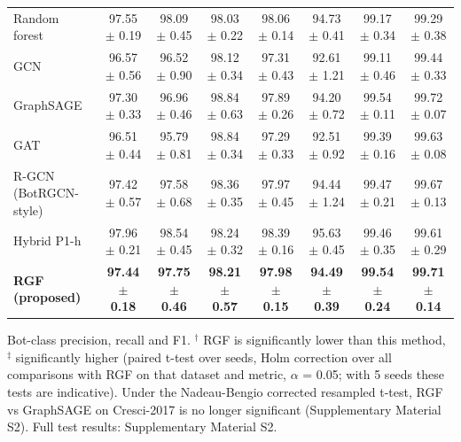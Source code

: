 \begin{table}[!t]
\begin{tabular}{lccccccc}
Random forest & 97.55 $\pm$ 0.19 & 98.09 $\pm$ 0.45 & 98.03 $\pm$ 0.22 & 98.06 $\pm$ 0.14 & 94.73 $\pm$ 0.41 & 99.17 $\pm$ 0.34 & 99.29 $\pm$ 0.38 \\
GCN & 96.57 $\pm$ 0.56 & 96.52 $\pm$ 0.90 & 98.12 $\pm$ 0.34 & 97.31 $\pm$ 0.43 & 92.61 $\pm$ 1.21 & 99.11 $\pm$ 0.46 & 99.44 $\pm$ 0.33 \\
GraphSAGE & 97.30 $\pm$ 0.33 & 96.96 $\pm$ 0.46 & 98.84 $\pm$ 0.63 & 97.89 $\pm$ 0.26 & 94.20 $\pm$ 0.72 & 99.54 $\pm$ 0.11 & 99.72 $\pm$ 0.07 \\
GAT & 96.51 $\pm$ 0.44 & 95.79 $\pm$ 0.81 & 98.84 $\pm$ 0.34 & 97.29 $\pm$ 0.33 & 92.51 $\pm$ 0.92 & 99.39 $\pm$ 0.16 & 99.63 $\pm$ 0.08 \\
R-GCN (BotRGCN-style) & 97.42 $\pm$ 0.57 & 97.58 $\pm$ 0.68 & 98.36 $\pm$ 0.35 & 97.97 $\pm$ 0.45 & 94.44 $\pm$ 1.24 & 99.47 $\pm$ 0.21 & 99.67 $\pm$ 0.13 \\
Hybrid P1-h & 97.96 $\pm$ 0.21 & 98.54 $\pm$ 0.45 & 98.24 $\pm$ 0.32 & 98.39 $\pm$ 0.16 & 95.63 $\pm$ 0.45 & 99.46 $\pm$ 0.35 & 99.61 $\pm$ 0.29 \\
\textbf{RGF (proposed)} & \textbf{97.44 $\pm$ 0.18} & \textbf{97.75 $\pm$ 0.46} & \textbf{98.21 $\pm$ 0.57} & \textbf{97.98 $\pm$ 0.15} & \textbf{94.49 $\pm$ 0.39} & \textbf{99.54 $\pm$ 0.24} & \textbf{99.71 $\pm$ 0.14} \\
\hline
\end{tabular}
\par\smallskip\parbox{\linewidth}{\scriptsize Bot-class precision, recall and F1. $^\dagger$ RGF is significantly lower than this method, $^\ddagger$ significantly higher (paired t-test over seeds, Holm correction over all comparisons with RGF on that dataset and metric, $\alpha$ = 0.05; with 5 seeds these tests are indicative). Under the Nadeau-Bengio corrected resampled t-test, RGF vs GraphSAGE on Cresci-2017 is no longer significant (Supplementary Material S2). Full test results: Supplementary Material S2.}
\end{table}